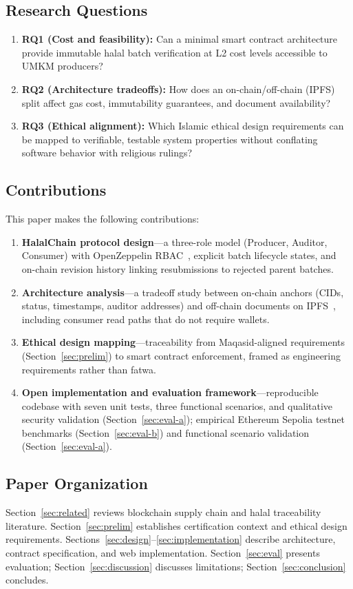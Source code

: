 \subsection{Research Questions}
\begin{enumerate}
  \item \textbf{RQ1 (Cost and feasibility):} Can a minimal smart contract architecture provide immutable halal batch verification at L2 cost levels accessible to UMKM producers?
  \item \textbf{RQ2 (Architecture tradeoffs):} How does an on-chain/off-chain (IPFS) split affect gas cost, immutability guarantees, and document availability?
  \item \textbf{RQ3 (Ethical alignment):} Which Islamic ethical design requirements can be mapped to verifiable, testable system properties without conflating software behavior with religious rulings?
\end{enumerate}

\subsection{Contributions}
This paper makes the following contributions:
\begin{enumerate}
  \item \textbf{HalalChain protocol design}---a three-role model (Producer, Auditor, Consumer) with OpenZeppelin RBAC~\cite{openzeppelin2024access}, explicit batch lifecycle states, and on-chain revision history linking resubmissions to rejected parent batches.
  \item \textbf{Architecture analysis}---a tradeoff study between on-chain anchors (CIDs, status, timestamps, auditor addresses) and off-chain documents on IPFS~\cite{benet2014ipfs,caro2018blockchain}, including consumer read paths that do not require wallets.
  \item \textbf{Ethical design mapping}---traceability from Maqasid-aligned requirements (Section~\ref{sec:prelim}) to smart contract enforcement, framed as engineering requirements rather than fatwa.
  \item \textbf{Open implementation and evaluation framework}---reproducible codebase with seven unit tests, three functional scenarios, and qualitative security validation (Section~\ref{sec:eval-a}); empirical Ethereum Sepolia testnet benchmarks (Section~\ref{sec:eval-b}) and functional scenario validation (Section~\ref{sec:eval-a}).
\end{enumerate}

\subsection{Paper Organization}
Section~\ref{sec:related} reviews blockchain supply chain and halal traceability literature.
Section~\ref{sec:prelim} establishes certification context and ethical design requirements.
Sections~\ref{sec:design}--\ref{sec:implementation} describe architecture, contract specification, and web implementation.
Section~\ref{sec:eval} presents evaluation; Section~\ref{sec:discussion} discusses limitations; Section~\ref{sec:conclusion} concludes.
